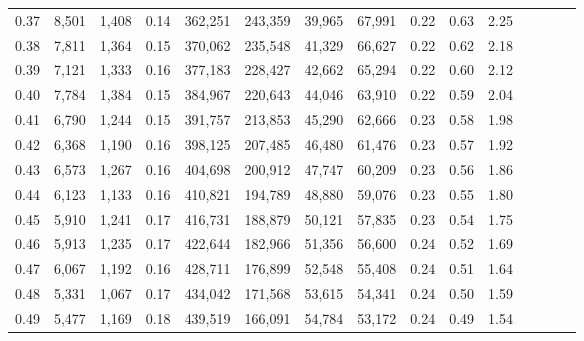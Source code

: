 \begin{tabular}{rrrcrrrrrrrrrrr}
0.37 &   8,501 &   1,408 &                                       0.14 &  362,251 &  243,359 &   39,965 &   67,991 &  0.22 &  0.63 &                         2.25 \\
0.38 &   7,811 &   1,364 &                                       0.15 &  370,062 &  235,548 &   41,329 &   66,627 &  0.22 &  0.62 &                         2.18 \\
0.39 &   7,121 &   1,333 &                                       0.16 &  377,183 &  228,427 &   42,662 &   65,294 &  0.22 &  0.60 &                         2.12 \\
0.40 &   7,784 &   1,384 &                                       0.15 &  384,967 &  220,643 &   44,046 &   63,910 &  0.22 &  0.59 &                         2.04 \\
0.41 &   6,790 &   1,244 &                                       0.15 &  391,757 &  213,853 &   45,290 &   62,666 &  0.23 &  0.58 &                         1.98 \\
0.42 &   6,368 &   1,190 &                                       0.16 &  398,125 &  207,485 &   46,480 &   61,476 &  0.23 &  0.57 &                         1.92 \\
0.43 &   6,573 &   1,267 &                                       0.16 &  404,698 &  200,912 &   47,747 &   60,209 &  0.23 &  0.56 &                         1.86 \\
0.44 &   6,123 &   1,133 &                                       0.16 &  410,821 &  194,789 &   48,880 &   59,076 &  0.23 &  0.55 &                         1.80 \\
0.45 &   5,910 &   1,241 &                                       0.17 &  416,731 &  188,879 &   50,121 &   57,835 &  0.23 &  0.54 &                         1.75 \\
0.46 &   5,913 &   1,235 &                                       0.17 &  422,644 &  182,966 &   51,356 &   56,600 &  0.24 &  0.52 &                         1.69 \\
0.47 &   6,067 &   1,192 &                                       0.16 &  428,711 &  176,899 &   52,548 &   55,408 &  0.24 &  0.51 &                         1.64 \\
0.48 &   5,331 &   1,067 &                                       0.17 &  434,042 &  171,568 &   53,615 &   54,341 &  0.24 &  0.50 &                         1.59 \\
0.49 &   5,477 &   1,169 &                                       0.18 &  439,519 &  166,091 &   54,784 &   53,172 &  0.24 &  0.49 &                         1.54 \\

\end{tabular}
